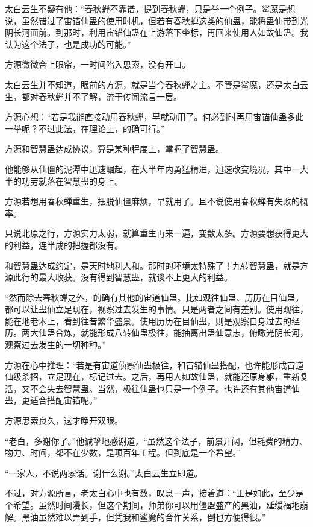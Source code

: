 \begin{this_body}
太白云生不疑有他：“春秋蝉不靠谱，提到春秋蝉，只是举一个例子。鲨魔是想说，虽然错过了宙锚仙蛊的使用时机，但若有春秋蝉这类的仙蛊，能将蛊仙带到光阴长河面前。到那时，利用宙锚仙蛊在上游落下坐标，再回来使用人如故仙蛊。我认为这个法子，也是成功的可能。”

方源微微合上眼帘，一时间陷入思索，没有开口。

太白云生并不知道，眼前的方源，就是当今春秋蝉之主。不管是鲨魔，还是太白云生，都对春秋蝉并不了解，流于传闻流言一层。

方源心想：“若是我能直接动用春秋蝉，早就动用了。何必到时再用宙锚仙蛊多此一举呢？不过此法，在理论上，的确可行。”

方源和智慧蛊达成协议，算是某种程度上，掌握了智慧蛊。

他能够从仙僵的泥潭中迅速崛起，在大半年内勇猛精进，迅速改变境况，其中一大半的功劳就落在智慧蛊的身上。

方源若想用春秋蝉重生，摆脱仙僵麻烦，早就用了。且不说使用春秋蝉有失败的概率。

只说北原之行，方源实力太弱，就算重生再来一遍，变数太多。方源要想获得更大的利益，连半成的把握都没有。

和智慧蛊达成约定，是天时地利人和。那时的环境太特殊了！九转智慧蛊，就是方源此行的最大收获。没有得到智慧蛊，就谈不上更大的利益。

“然而除去春秋蝉之外，的确有其他的宙道仙蛊。比如观往仙蛊、历历在目仙蛊，都可以让蛊仙立足现在，视察过去发生的事情。只是两者之间有差别。使用观往，能在地老木上，看到往昔繁华盛景。使用历历在目仙蛊，则是观察自身过去的经历。两大仙蛊合炼，就能形成八转仙蛊极往，能抽离出蛊仙意志，俯瞰光阴长河，观察过去发生的一切种种。”

方源在心中推理：“若是有宙道侦察仙蛊极往，和宙锚仙蛊搭配，也许能形成宙道仙级杀招，立足现在，标记过去。之后，再用人如故仙蛊，就能还原身躯，重新复活，又不会失去智慧蛊。当然，极往仙蛊也只是一个例子。也许还有其他宙道仙蛊，更适合搭配宙锚呢。”

方源思索良久，这才睁开双眼。

“老白，多谢你了。”他诚挚地感谢道，“虽然这个法子，前景开阔，但耗费的精力、物力、时间，都不在少数，是项百年工程。但到底是一个希望。”

“一家人，不说两家话。谢什么谢。”太白云生立即道。

不过，对方源所言，老太白心中也有数，叹息一声，接着道：“正是如此，至少是个希望。虽然时间漫长，但这个期间，师弟你可以用僵盟盛产的黑油，延缓福地崩解。黑油虽然难以弄到手，但凭我和鲨魔的合作关系，倒也方便得很。”


\end{this_body}
